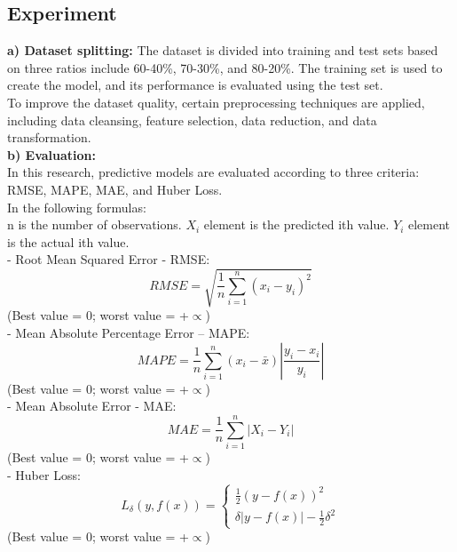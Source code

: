 \documentclass{ieeeojies}
\begin{document}
\subsection{Experiment}
\textbf{a) Dataset splitting:}
The dataset is divided into training and test sets
based on three ratios include 60-40\%, 70-30\%, and 80-20\%. The training set is used to create the model, and its performance is evaluated using the test set.\\
To improve the dataset quality, certain preprocessing techniques are applied, including data cleansing, feature selection, data reduction, and data transformation.\\
\textbf{b) Evaluation:}\\
In this research, predictive models are evaluated according to three criteria: RMSE, MAPE, MAE, and Huber Loss.\\ 
In the following formulas:\\
\textbullet n is the number of observations.
\textbullet $X_i$ element is the predicted ith value.
\textbullet $Y_i$ element is the actual ith value.\\
- Root Mean Squared Error - RMSE:\\
\begin{equation}
    RMSE = \sqrt{\frac{1}{n}\sum_{i=1}^{n}{(x_{i}-y_{i})}^2}
\end{equation}
(Best value = 0; worst value = +$\propto$)\\
- Mean Absolute Percentage Error – MAPE:\\
\begin{equation}
    MAPE = \frac{1}{n}\sum_{i=1}^{n}{(x_{i}-\bar{x})}|\frac{y_i - x_i}{y_i}|
\end{equation}
(Best value = 0; worst value = +$\propto$)\\
- Mean Absolute Error - MAE:\\
\begin{equation}
    MAE = \frac{1}{n}\sum_{i=1}^{n}|X_i - Y_i|
\end{equation}
(Best value = 0; worst value = +$\propto$)\\
- Huber Loss:
\begin{equation}
    L_{\delta}(y,f(x)) = \begin{cases}
    \frac {1}{2} {(y-f(x))}^{2}\\
    {\delta} |y-f(x)| - \frac {1}{2} {\delta}^{2}
    \end{cases}
\end{equation}
(Best value = 0; worst value = +$\propto$)\\
\end{document}

